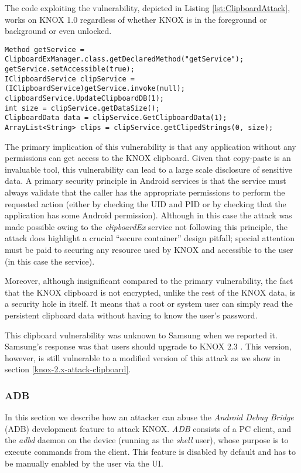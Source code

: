 \documentclass[11pt]{article}
\begin{document}
The code exploiting the vulnerability, depicted in Listing \ref{lst:ClipboardAttack}, works on 
KNOX 1.0 regardless of whether KNOX is in the foreground or background or even unlocked.

\begin{lstlisting}[breaklines=true, caption={Clipboard Attack Code}, label={lst:ClipboardAttack}]
Method getService = ClipboardExManager.class.getDeclaredMethod("getService");
getService.setAccessible(true);
IClipboardService clipService = (IClipboardService)getService.invoke(null);
clipboardService.UpdateClipboardDB(1);
int size = clipService.getDataSize();
ClipboardData data = clipService.GetClipboardData(1);
ArrayList<String> clips = clipService.getClipedStrings(0, size);
\end{lstlisting}

The primary implication of this vulnerability is that any application without any permissions can get access to the KNOX clipboard.
Given that copy-paste is an invaluable tool, this vulnerability can lead to a large scale disclosure of sensitive data.
A primary security principle in Android services is that the service must always validate that the caller has the appropriate permissions to perform
the requested action (either by checking the UID and PID or by checking that the application has some Android permission). 
Although in this case the attack was made possible owing to the \emph{clipboardEx} service not following this principle, the attack does highlight a crucial 
``secure container'' design pitfall; special attention must be paid to securing any resource used by KNOX and accessible to the user (in this case the service).

Moreover, although insignificant compared to the primary vulnerability, the fact that the KNOX clipboard is not encrypted, unlike the rest
of the KNOX data, is a security hole in itself.
It means that a root or system user can simply read the persistent clipboard data without having to know the user's password.

This clipboard vulnerability was unknown to Samsung when we reported it. Samsung's response was that users should upgrade to 
KNOX 2.3 \cite{SamsungCorrespondence}. This version, however, is still vulnerable to a modified version of this attack as we show in section \ref{knox-2.x-attack-clipboard}.

\subsubsection{ADB} \label{knox-1.0-attacks-adb}
In this section we describe how an attacker can abuse the \emph{Android Debug Bridge} (ADB) development feature to attack KNOX.
\emph{ADB} consists of a PC client, and the \emph{adbd} daemon on the device (running as the \emph{shell} user), 
whose purpose is to execute commands from the client.
This feature is disabled by default and has to be manually enabled by the user via the UI.
\end{document}
